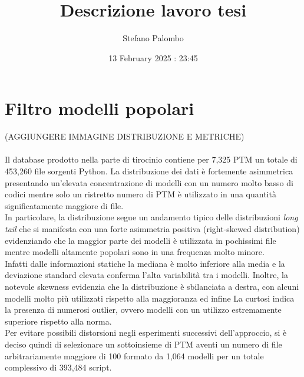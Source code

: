\documentclass{article}
\title{Descrizione lavoro tesi}
\author{Stefano Palombo}
\date{13 February 2025 : 23:45}
\begin{document}
\maketitle

\section{Filtro modelli popolari}
(AGGIUNGERE IMMAGINE DISTRIBUZIONE E METRICHE)\\
\\
Il database prodotto nella parte di tirocinio contiene per 7,325 PTM un totale di 453,260 file sorgenti Python. La distribuzione dei dati è fortemente asimmetrica presentando un'elevata concentrazione di modelli con un numero molto basso di codici mentre solo un ristretto numero di PTM è utilizzato in una quantità significatamente maggiore di file.\\
In particolare, la distribuzione segue un andamento tipico delle distribuzioni \textit{long tail} che si manifesta con una forte asimmetria positiva (right-skewed distribution) evidenziando che la maggior parte dei modelli è utilizzata in pochissimi file mentre modelli altamente popolari sono in una frequenza molto minore.\\
Infatti dalle informazioni statiche la mediana è molto inferiore alla media e la deviazione standard elevata conferma l'alta variabilità tra i modelli. Inoltre, la notevole skewness evidenzia che la distribuzione è sbilanciata a destra, con alcuni modelli molto più utilizzati rispetto alla maggioranza ed infine La curtosi indica la presenza di numerosi outlier, ovvero modelli con un utilizzo estremamente superiore rispetto alla norma.\\
Per evitare possibili distorsioni negli esperimenti successivi dell'approccio, si è deciso quindi di selezionare un sottoinsieme di PTM aventi un numero di file arbitrariamente maggiore di 100 formato da 1,064 modelli per un totale complessivo di 393,484 script.
\end{document}
